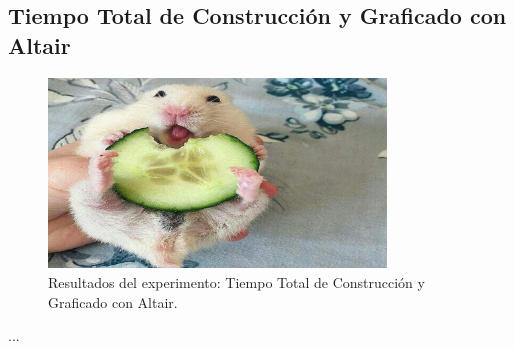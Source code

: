 \subsection{Tiempo Total de Construcción y Graficado con Altair}
\label{exp:altair-total-time}

\begin{figure}[H]
    \centering
    \includegraphics[width=0.8\textwidth]{testing/images/altair_total_time.png}
    \caption{Resultados del experimento: Tiempo Total de Construcción y Graficado con Altair.}
    \label{fig:altair-total-time}
\end{figure}

...
